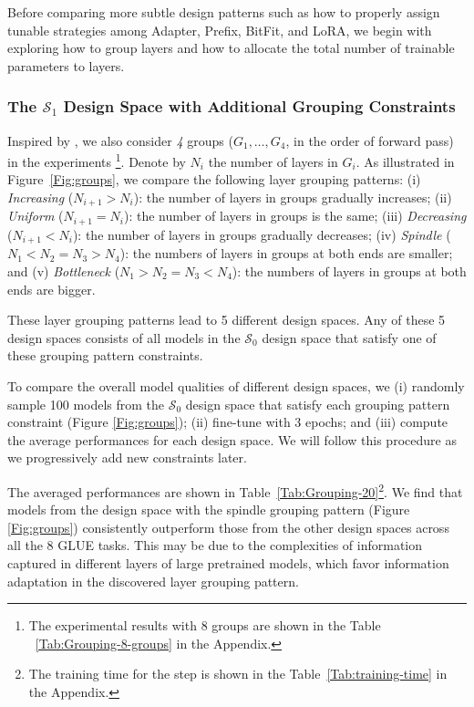 Before comparing more subtle design patterns such as how to properly assign tunable strategies among Adapter, Prefix, BitFit, and LoRA, we begin with exploring how to group layers and how to allocate the total number of trainable parameters to layers.

\subsubsection{The $\mathcal{S}_1$ Design Space with Additional Grouping Constraints} \label{Sec:grouping}

Inspired by \citet{https://doi.org/10.48550/arxiv.2003.13678}, we also consider \textit{4} groups ($G_1, \ldots, G_4$, in the order of forward pass) in the experiments \footnote{The experimental results with 8 groups are shown in the Table ~\ref{Tab:Grouping-8-groups} in the Appendix.}. Denote  by $N_i$ the number of layers in $G_i$. As illustrated in Figure~\ref{Fig:groups},
we compare the following layer grouping patterns: (i) \textit{Increasing} ($N_{i+1} > N_i$): the number of layers in groups gradually increases; (ii) \textit{Uniform} ($N_{i+1} = N_i$): the number of layers in groups is the same; (iii) \textit{Decreasing} ($N_{i+1} < N_i$): the number of layers in groups gradually decreases; (iv) \textit{Spindle} (${N_1 < N_2 = N_3 > N_4}$): the numbers of layers in groups at both ends are smaller; and (v) \textit{Bottleneck} ($N_1 > N_2 = N_3 < N_4$): the numbers of layers in groups at both ends are bigger. 

These layer grouping patterns lead to 5 different design spaces. Any of these 5 design spaces consists of all models in the $\mathcal{S}_0$ design space that satisfy one of these grouping pattern constraints.

To compare the overall model qualities of different design spaces, we (i) randomly sample 100 models from the $\mathcal{S}_0$ design space that satisfy each grouping pattern constraint (Figure \ref{Fig:groups});
(ii) fine-tune with 3 epochs; and (iii) compute the average performances for each design space. We will follow this procedure as we progressively add new constraints later.

The averaged performances are shown in Table~\ref{Tab:Grouping-20}\footnote{The training time for the step is shown in the Table~\ref{Tab:training-time} in the Appendix.}.  We find that models from the design space with the spindle grouping pattern (Figure \ref{Fig:groups}) consistently outperform those from the other design spaces across all the 8 GLUE tasks. This may be due to the complexities of information captured in different layers of large pretrained models, which favor information adaptation in the discovered layer grouping pattern.

